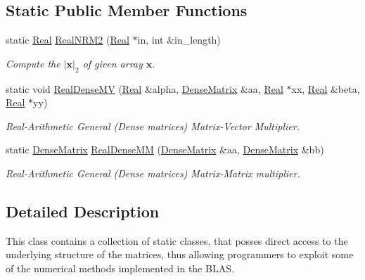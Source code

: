 \subsection*{Static Public Member Functions}
\begin{DoxyCompactItemize}
\item 
static \hyperlink{group__c01-roots_gac080bbbf5cbb5502c9f00405f894857d}{Real} \hyperlink{classmtk_1_1BLASAdapter_ab92440888b730863244c5d9479c11aca}{Real\-N\-R\-M2} (\hyperlink{group__c01-roots_gac080bbbf5cbb5502c9f00405f894857d}{Real} $\ast$in, int \&in\-\_\-length)
\begin{DoxyCompactList}\small\item\em Compute the $ |\mathbf{x}|_2 $ of given array $ \mathbf{x} $. \end{DoxyCompactList}\item 
static void \hyperlink{classmtk_1_1BLASAdapter_afdcac059a4294287cb55638221220646}{Real\-Dense\-M\-V} (\hyperlink{group__c01-roots_gac080bbbf5cbb5502c9f00405f894857d}{Real} \&alpha, \hyperlink{classmtk_1_1DenseMatrix}{Dense\-Matrix} \&aa, \hyperlink{group__c01-roots_gac080bbbf5cbb5502c9f00405f894857d}{Real} $\ast$xx, \hyperlink{group__c01-roots_gac080bbbf5cbb5502c9f00405f894857d}{Real} \&beta, \hyperlink{group__c01-roots_gac080bbbf5cbb5502c9f00405f894857d}{Real} $\ast$yy)
\begin{DoxyCompactList}\small\item\em Real-\/\-Arithmetic General (Dense matrices) Matrix-\/\-Vector Multiplier. \end{DoxyCompactList}\item 
static \hyperlink{classmtk_1_1DenseMatrix}{Dense\-Matrix} \hyperlink{classmtk_1_1BLASAdapter_acebd0e9bfe0bdd609c7fbea98ccfd3b5}{Real\-Dense\-M\-M} (\hyperlink{classmtk_1_1DenseMatrix}{Dense\-Matrix} \&aa, \hyperlink{classmtk_1_1DenseMatrix}{Dense\-Matrix} \&bb)
\begin{DoxyCompactList}\small\item\em Real-\/\-Arithmetic General (Dense matrices) Matrix-\/\-Matrix multiplier. \end{DoxyCompactList}\end{DoxyCompactItemize}


\subsection{Detailed Description}
This class contains a collection of static classes, that posses direct access to the underlying structure of the matrices, thus allowing programmers to exploit some of the numerical methods implemented in the B\-L\-A\-S.

